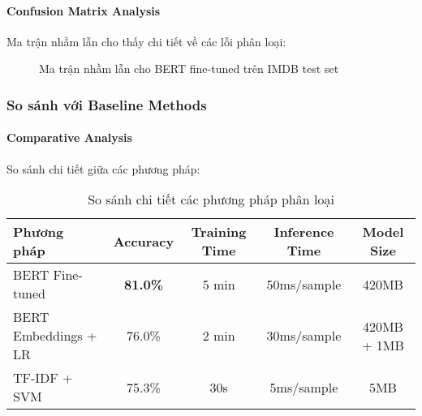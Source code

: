 \paragraph{Confusion Matrix Analysis}
Ma trận nhầm lẫn cho thấy chi tiết về các lỗi phân loại:

\begin{figure}[H]
\centering
{}
\caption{Ma trận nhầm lẫn cho BERT fine-tuned trên IMDB test set}
\label{fig:confusion_matrix}
\end{figure}

\subsubsection{So sánh với Baseline Methods}

\paragraph{Comparative Analysis}
So sánh chi tiết giữa các phương pháp:

\begin{table}[H]
\centering
\caption{So sánh chi tiết các phương pháp phân loại}
\label{tab:detailed_comparison}
\begin{tabular}{lcccc}
\toprule
\textbf{Phương pháp} & \textbf{Accuracy} & \textbf{Training Time} & \textbf{Inference Time} & \textbf{Model Size} \\
\midrule
BERT Fine-tuned & \textbf{81.0\%} & 5 min & 50ms/sample & 420MB \\
BERT Embeddings + LR & 76.0\% & 2 min & 30ms/sample & 420MB + 1MB \\
TF-IDF + SVM & 75.3\% & 30s & 5ms/sample & 5MB \\
\bottomrule
\end{tabular}
\end{table}


